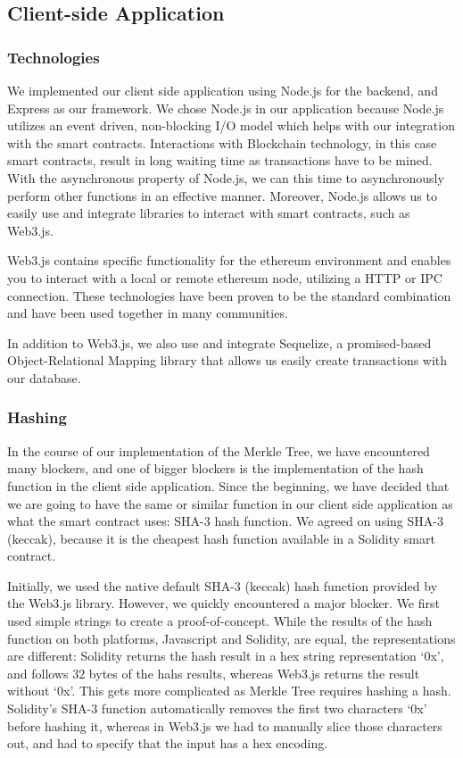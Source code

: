 \subsection{Client-side Application}
\label{subsec:approach-implementation-client}

\subsubsection*{Technologies}

We implemented our client side application using Node.js for the backend, and Express as our framework. We chose Node.js in our application because Node.js utilizes an event driven, non-blocking I/O model which helps with our integration with the smart contracts. Interactions with Blockchain technology, in this case smart contracts, result in long waiting time as transactions have to be mined. With the asynchronous property of Node.js, we can this time to asynchronously perform other functions in an effective manner. Moreover, Node.js allows us to easily use and integrate libraries to interact with smart contracts, such as Web3.js.

Web3.js contains specific functionality for the ethereum environment and enables you to interact with a local or remote ethereum node, utilizing a HTTP or IPC connection. These technologies have been proven to be the standard combination and have been used together in many communities. 

In addition to Web3.js, we also use and integrate Sequelize, a promised-based Object-Relational Mapping library that allows us easily create transactions with our database.

\subsubsection*{Hashing}

In the course of our implementation of the Merkle Tree, we have encountered many blockers, and one of bigger blockers is the implementation of the hash function in the client side application. Since the beginning, we have decided that we are going to have the same or similar function in our client side application as what the smart contract uses: SHA-3 hash function. We agreed on using SHA-3 (keccak), because it is the cheapest hash function available in a Solidity smart contract. 

Initially, we used the native default SHA-3 (keccak) hash function provided by the Web3.js library. However, we quickly encountered a major blocker. We first used simple strings to create a proof-of-concept. While the results of the hash function on both platforms, Javascript and Solidity, are equal, the representations are different: Solidity returns the hash result in a hex string representation ‘0x’, and follows 32 bytes of the hahs results, whereas Web3.js returns the result without ‘0x’. This gets more complicated as Merkle Tree requires hashing a hash. Solidity’s SHA-3 function automatically removes the first two characters ‘0x’ before hashing it, whereas in Web3.js we had to manually slice those characters out, and had to specify that the input has a hex encoding. 

